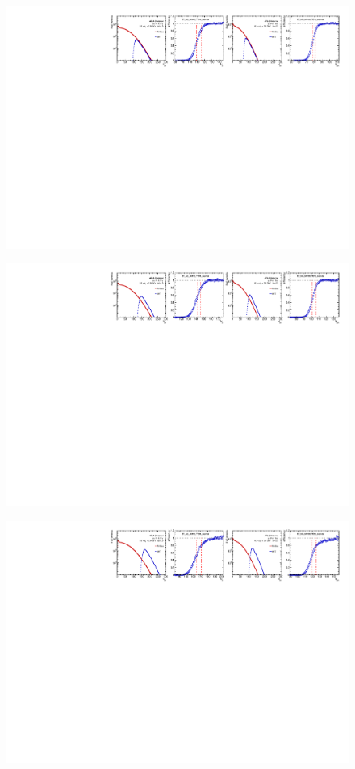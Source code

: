 \begin{figure}[H]
\centering
\includegraphics[width=1.\linewidth]{figs/sec_evtSlc/trigEff_pPb5_run1/trigEff_Trig8.pdf}
\end{figure}
\begin{figure}[H]
\centering
\includegraphics[width=1.\linewidth]{figs/sec_evtSlc/trigEff_pPb5_run1/trigEff_Trig9.pdf}
\end{figure}
\begin{figure}[H]
\centering
\includegraphics[width=1.\linewidth]{figs/sec_evtSlc/trigEff_pPb5_run1/trigEff_Trig10.pdf}
\end{figure}
